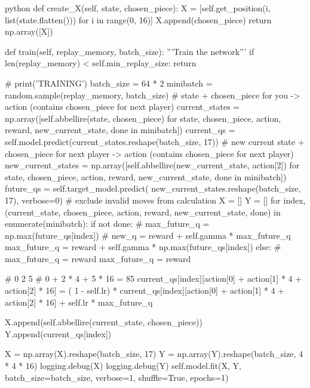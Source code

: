 \begin{mintedbox}{python}
    def create_X(self, state, chosen_piece):
        X = [self.get_position(i, list(state.flatten())) for i in range(0, 16)]
        X.append(chosen_piece)
        return np.array([X])

    def train(self, replay_memory, batch_size):
        '''Train the network'''
        if len(replay_memory) < self.min_replay_size:
            return

        # print('TRAINING')
        batch_size = 64 * 2
        minibatch = random.sample(replay_memory, batch_size)
        # state + chosen_piece for you -> action (contains chosen_piece for next player)
        current_states = np.array([self.abbellire(state, chosen_piece)
                                    for state, chosen_piece, action, reward, new_current_state, done in minibatch])
        current_qs = self.model.predict(current_states.reshape(batch_size, 17))
        # new current state + chosen_piece for next player -> action (contains chosen_piece for next player)
        new_current_states = np.array([self.abbellire(new_current_state, action[2])
                                        for state, chosen_piece, action, reward, new_current_state, done in minibatch])
        future_qs = self.target_model.predict(
            new_current_states.reshape(batch_size, 17), verbose=0)
        # exclude invalid moves from calculation
        X = []
        Y = []
        for index, (current_state, chosen_piece, action, reward, new_current_state, done) in enumerate(minibatch):
            if not done:
                # max_future_q = np.max(future_qs[index])
                # new_q = reward + self.gamma * max_future_q
                max_future_q = reward + self.gamma * np.max(future_qs[index])
            else:
                # max_future_q = reward
                max_future_q = reward

            # 0 2 5
            # 0 + 2 * 4 + 5 * 16 = 85
            current_qs[index][action[0] + action[1] * 4 + action[2] * 16] = (
                1 - self.lr) * current_qs[index][action[0] + action[1] * 4 + action[2] * 16] + self.lr * max_future_q

            X.append(self.abbellire(current_state, chosen_piece))
            Y.append(current_qs[index])

        X = np.array(X).reshape(batch_size, 17)
        Y = np.array(Y).reshape(batch_size, 4 * 4 * 16)
        logging.debug(X)
        logging.debug(Y)
        self.model.fit(X, Y, batch_size=batch_size,
                        verbose=1, shuffle=True, epochs=1)


\end{mintedbox}
